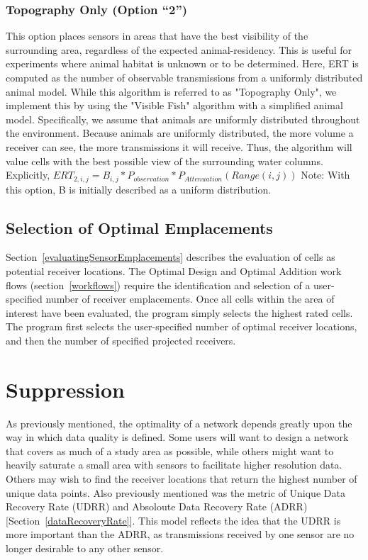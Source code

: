 \subsubsection{Topography Only (Option “2”)}
This option places sensors in areas that have the best visibility of the surrounding area, regardless of the expected animal-residency.  This is useful for experiments where animal habitat is unknown or to be determined.  Here, ERT is computed as the number of observable transmissions from a uniformly distributed animal model.  While this algorithm is referred to as "Topography Only", we implement this by using the "Visible Fish" algorithm with a simplified animal model.  Specifically, we assume that animals are uniformly distributed throughout the environment.  Because animals are uniformly distributed, the more volume a receiver can see, the more transmissions it will receive.  Thus, the algorithm will value cells with the best possible view of the surrounding water columns.\newline
Explicitly,
$ERT_{2,i,j} =  B_{i,j} * P_{observation} * P_{Attenuation}(Range(i,j))$\newline
Note: With this option, B is initially described as a uniform distribution.


\subsection{Selection of Optimal Emplacements}
\label{selectionOfOptimalEmplacements}
Section~\ref{evaluatingSensorEmplacements} describes the evaluation of cells as potential receiver locations.  The Optimal Design and Optimal Addition work flows (section~\ref{workflows}) require the identification and selection of a user-specified number of receiver emplacements.  Once all cells within the area of interest have been evaluated, the program simply selects the highest rated cells.  The program first selects the user-specified number of optimal receiver locations, and then the number of specified projected receivers.


\section{Suppression}
\label{suppression}
As previously mentioned, the optimality of a network depends greatly upon the way in which data quality is defined.  Some users will want to design a network that covers as much of a study area as possible, while others might want to heavily saturate a small area with sensors to facilitate higher resolution data.  Others may wish to find the receiver locations that return the highest number of unique data points.  Also previously mentioned was the metric of Unique Data Recovery Rate (UDRR) and Absoloute Data Recovery Rate (ADRR) [Section~\ref{dataRecoveryRate}].  This model reflects the idea that the UDRR is more important than the ADRR, as transmissions received by one sensor are no longer desirable to any other sensor.

